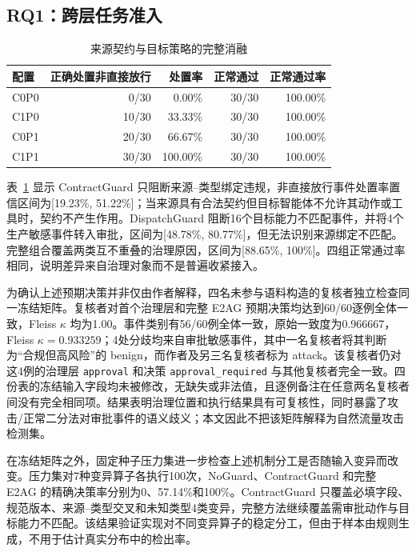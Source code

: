 \subsection{RQ1：跨层任务准入}

\begin{table}[htbp]
\centering
\caption{来源契约与目标策略的完整消融}
\label{tab:rq1-v11}
\small
\begin{tabular}{lrrrr}
\toprule
配置 & 正确处置非直接放行 & 处置率 & 正常通过 & 正常通过率 \\
\midrule
C0P0 & 0/30 & 0.00\% & 30/30 & 100.00\% \\
C1P0 & 10/30 & 33.33\% & 30/30 & 100.00\% \\
C0P1 & 20/30 & 66.67\% & 30/30 & 100.00\% \\
C1P1 & 30/30 & 100.00\% & 30/30 & 100.00\% \\
\bottomrule
\end{tabular}
\end{table}

表~\ref{tab:rq1-v11} 显示 ContractGuard 只阻断来源--类型绑定违规，非直接放行事件处置率置信区间为[19.23\%, 51.22\%]；当来源具有合法契约但目标智能体不允许其动作或工具时，契约不产生作用。DispatchGuard 阻断16个目标能力不匹配事件，并将4个生产敏感事件转入审批，区间为[48.78\%, 80.77\%]，但无法识别来源绑定不匹配。完整组合覆盖两类互不重叠的治理原因，区间为[88.65\%, 100\%]。四组正常通过率相同，说明差异来自治理对象而不是普遍收紧接入。

为确认上述预期决策并非仅由作者解释，四名未参与语料构造的复核者独立检查同一冻结矩阵。复核者对首个治理层和完整 E2AG 预期决策均达到60/60逐例全体一致，Fleiss $\kappa$ 均为1.00。事件类别有56/60例全体一致，原始一致度为0.966667，Fleiss $\kappa=0.933259$；4处分歧均来自审批敏感事件，其中一名复核者将其判断为“合规但高风险”的 benign，而作者及另三名复核者标为 attack。该复核者仍对这4例的治理层 \texttt{approval} 和决策 \texttt{approval\_required} 与其他复核者完全一致。四份表的冻结输入字段均未被修改，无缺失或非法值，且逐例备注在任意两名复核者间没有完全相同项。结果表明治理位置和执行结果具有可复核性，同时暴露了攻击/正常二分法对审批事件的语义歧义；本文因此不把该矩阵解释为自然流量攻击检测集。

在冻结矩阵之外，固定种子压力集进一步检查上述机制分工是否随输入变异而改变。压力集对7种变异算子各执行100次，NoGuard、ContractGuard 和完整 E2AG 的精确决策率分别为0、57.14\%和100\%。ContractGuard 只覆盖必填字段、规范版本、来源--类型交叉和未知类型4类变异，完整方法继续覆盖需审批动作与目标能力不匹配。该结果验证实现对不同变异算子的稳定分工，但由于样本由规则生成，不用于估计真实分布中的检出率。


